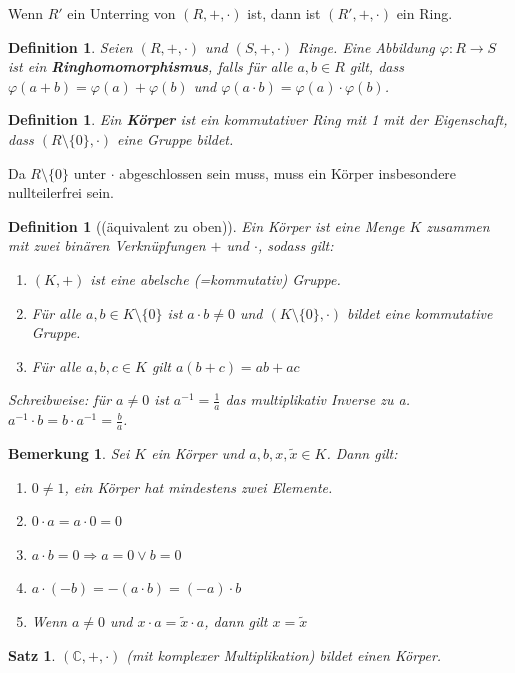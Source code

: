 \documentclass[12pt,a4paper]{article}
\theoremstyle{plain}
\newtheorem{Satz}[Theorem]{Satz}
\newtheorem{Definition}[Theorem]{Definition}
\newtheorem{Bemerkung}[Theorem]{Bemerkung}
\newcommand{\herv}[1]{{\emph{\textbf{#1}}}}
\newcommand{\C}{\mathbb{C}}
\numberwithin{equation}{section}
\begin{document}
Wenn $R'$ ein Unterring von $(R,+,\cdot)$ ist, dann ist $(R',+,\cdot)$ ein Ring.
\begin{Definition}
Seien $(R,+,\cdot)$ und $(S,+,\cdot)$ Ringe. Eine Abbildung $\varphi: R\rightarrow S$ ist ein \herv{Ringhomomorphismus}, falls für alle $a,b\in R$ gilt, dass $\varphi(a+b)=\varphi(a)+\varphi(b)$ und $\varphi(a\cdot b)=\varphi(a)\cdot \varphi(b)$.
\end{Definition}
\begin{Definition}
Ein \herv{Körper} ist ein kommutativer Ring mit 1 mit der Eigenschaft, dass $(R\setminus\{0\},\cdot)$ eine Gruppe bildet.
\end{Definition}
Da $R\setminus\{0\}$ unter $\cdot$ abgeschlossen sein muss, muss ein Körper insbesondere nullteilerfrei sein.
\begin{Definition}[(äquivalent zu oben)]
Ein Körper ist eine Menge $K$ zusammen mit zwei binären Verknüpfungen $+$ und $\cdot$, sodass gilt:
\begin{enumerate}
\renewcommand{\labelenumi}{\emph{(K\arabic{enumi})}}
\item $(K,+)$ ist eine abelsche (=kommutativ) Gruppe.
\item Für alle $a,b\in K\setminus\{0\}$ ist $a\cdot b\neq 0$ und $(K\setminus\{0\},\cdot)$ bildet eine kommutative Gruppe.
\item Für alle $a,b,c\in K$ gilt $a(b+c)=ab+ac$
\end{enumerate}
Schreibweise: für $a\neq 0$ ist $a^{-1}=\frac{1}{a}$ das multiplikativ Inverse zu a. $a^{-1}\cdot b=b\cdot a^{-1}=\frac{b}{a}$.
\end{Definition}
\begin{Bemerkung}
Sei $K$ ein Körper und $a,b,x,\tilde{x}\in K$. Dann gilt:
\begin{enumerate}
\renewcommand{\labelenumi}{(\alph{enumi})}
\item $0\neq 1$, ein Körper hat mindestens zwei Elemente.
\item $0\cdot a=a\cdot 0=0$
\item $a\cdot b=0 \Rightarrow a=0 \vee b=0$
\item $a\cdot (-b)=-(a\cdot b)=(-a)\cdot b$
\item Wenn $a\neq 0$ und $x\cdot a=\tilde{x}\cdot a$, dann gilt $x=\tilde{x}$
\end{enumerate}
\end{Bemerkung}
\begin{Satz}
$(\C,+,\cdot)$ (mit komplexer Multiplikation) bildet einen Körper.
\end{Satz}
\end{document}
